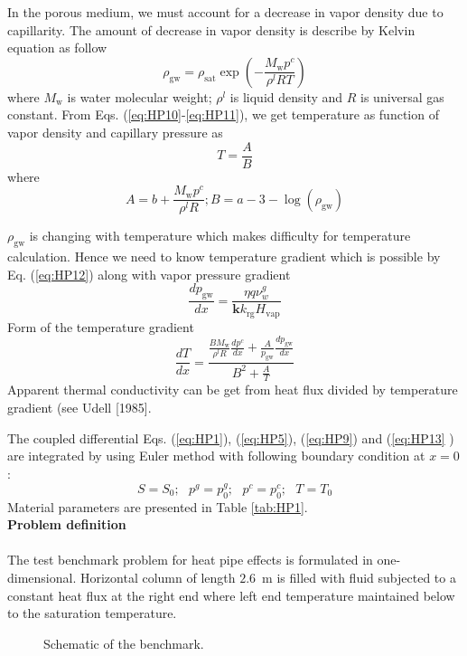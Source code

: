 In the porous medium, we must account for a decrease in vapor density due to capillarity. The amount of decrease in vapor density is describe by Kelvin equation as follow
\begin{equation}
\rho_{\mathrm {gw}}=\rho_{\mathrm {sat}}\exp\left(-\frac{M_{\mathrm w} p^c}{\rho^l RT}\right)
\label{eq:HP11}
\end{equation}
where $M_{\mathrm w}$ is water molecular weight; $\rho^l$ is liquid density and $R$ is universal gas constant. From Eqs. (\ref{eq:HP10}-\ref{eq:HP11}), we get temperature as function of vapor density and capillary pressure as
\begin{equation}
T=\frac{A}{B}
\label{eq:HP12}
\end{equation}
where
\begin{equation*}
 A=b+\frac{M_{\mathrm w} p^c}{\rho^l R}; B=a-3 -\log\left(\rho_{\mathrm {gw}}\right)
 \label{eq:HP20}
\end{equation*}


$\rho_{\mathrm {gw}}$ is changing with temperature which makes difficulty for temperature calculation. Hence we need to know temperature gradient which is possible by Eq. (\ref{eq:HP12}) along with vapor pressure gradient 
\begin{equation}
\frac{d p_{\mathrm{gw}}}{d x} = \frac{\eta q \nu^g_w}{\mathbf k k_{\mathrm {rg}} H_{\mathrm {vap}}}
\label{eq:HP18}
\end{equation}
Form of the temperature gradient
\begin{equation}
\frac{d T}{d x}=\frac{\frac{B M_{\mathrm w}}{\rho^l R} \frac{d p^c}{d x} + \frac{A}{p_{\mathrm{gw}}} \frac{d p_{\mathrm{gw}}}{d x}}{B^2+\frac{A}{T}}
\label{eq:HP13}
\end{equation}
Apparent thermal conductivity can be get from heat flux divided by temperature gradient (see Udell [1985].


The coupled differential Eqs. (\ref{eq:HP1}), (\ref{eq:HP5}), (\ref{eq:HP9}) and (\ref{eq:HP13} ) are integrated by using Euler method with following boundary condition at $x=0$:
\begin{equation}
S=S_0;~~~ p^g=p^g_0;~~~p^c=p^c_0;~~~T=T_0
\label{eq:HP14}
\end{equation}
Material parameters are presented in Table \ref{tab:HP1}.\\

\textbf{Problem definition}\\\\
The test benchmark problem for heat pipe effects is formulated in one-dimensional. 
Horizontal column of length $2.6$~m is filled with fluid subjected to a constant heat flux at the right end where left end temperature maintained below to the saturation temperature.
\begin{figure}[htb]
\begin{center}
\end{center}
\caption{Schematic of the benchmark.}
\label{Fig:HP1}
\end{figure}\\


